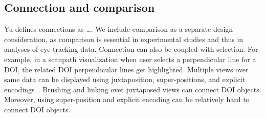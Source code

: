 	
	\subsection{Connection and comparison} Yu defines connections as …. We include comparison as a separate design consideration, as comparison is essential in experimental studies and thus in analyses of eye-tracking data. Connection can also be coupled with selection. For example, in a scanpath visualization when user selects a perpendicular line for a DOI, the related DOI perpendicular lines get highlighted. Multiple views over same data can be displayed using juxtaposition, super-positions, and explicit encodings~\cite{gleicher2011visual}. Brushing and linking over juxtaposed views can connect DOI objects. Moreover, using super-position and explicit encoding can be relatively hard to connect DOI objects. 
